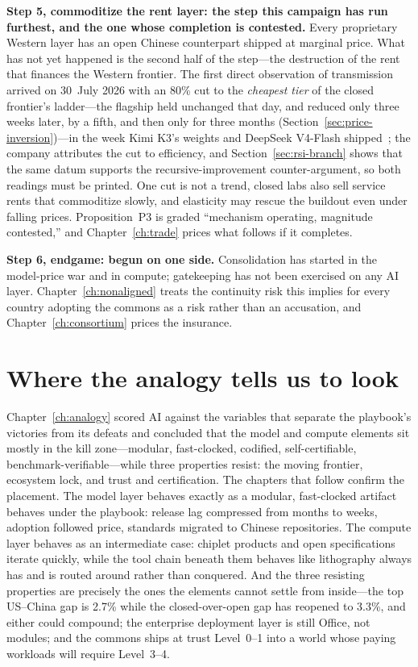 \textbf{Step 5, commoditize the rent layer: the step this campaign has run furthest, and the one whose completion is contested.} Every proprietary Western layer has an open Chinese counterpart shipped at marginal price. What has not yet happened is the second half of the step---the destruction of the rent that finances the Western frontier. The first direct observation of transmission arrived on 30~July 2026 with an 80\% cut to the \emph{cheapest tier} of the closed frontier's ladder---the flagship held unchanged that day, and reduced only three weeks later, by a fifth, and then only for three months (Section~\ref{sec:price-inversion})---in the week Kimi K3's weights and DeepSeek V4-Flash shipped~\cite{openai-cut}; the company attributes the cut to efficiency, and Section~\ref{sec:rsi-branch} shows that the same datum supports the recursive-improvement counter-argument, so both readings must be printed. One cut is not a trend, closed labs also sell service rents that commoditize slowly, and elasticity may rescue the buildout even under falling prices. Proposition~P3 is graded ``mechanism operating, magnitude contested,'' and Chapter~\ref{ch:trade} prices what follows if it completes.

\textbf{Step 6, endgame: begun on one side.} Consolidation has started in the model-price war and in compute; gatekeeping has not been exercised on any AI layer. Chapter~\ref{ch:nonaligned} treats the continuity risk this implies for every country adopting the commons as a risk rather than an accusation, and Chapter~\ref{ch:consortium} prices the insurance.

\section{Where the analogy tells us to look}

Chapter~\ref{ch:analogy} scored AI against the variables that separate the playbook's victories from its defeats and concluded that the model and compute elements sit mostly in the kill zone---modular, fast-clocked, codified, self-certifiable, benchmark-verifiable---while three properties resist: the moving frontier, ecosystem lock, and trust and certification. The chapters that follow confirm the placement. The model layer behaves exactly as a modular, fast-clocked artifact behaves under the playbook: release lag compressed from months to weeks, adoption followed price, standards migrated to Chinese repositories. The compute layer behaves as an intermediate case: chiplet products and open specifications iterate quickly, while the tool chain beneath them behaves like lithography always has and is routed around rather than conquered. And the three resisting properties are precisely the ones the elements cannot settle from inside---the top US--China gap is 2.7\% while the closed-over-open gap has reopened to 3.3\%, and either could compound; the enterprise deployment layer is still Office, not modules; and the commons ships at trust Level~0--1 into a world whose paying workloads will require Level~3--4.

